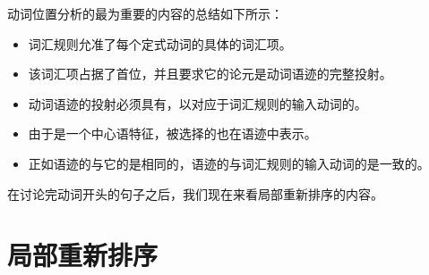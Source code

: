 动词位置分析的最为重要的内容的总结如下所示：
\begin{itemize}
\item 词汇规则允准了每个定式动词的具体的词汇项。
\item 该词汇项占据了首位，并且要求它的论元是动词语迹的完整投射。
\item 动词语迹的投射必须具有\dslv ，以对应于词汇规则的输入动词的\localv 。
\item 由于\dsl 是一个中心语特征，被选择的\dslv 也在语迹中表示。
\item 正如语迹的\dslv 与它的\localv 是相同的，语迹的\localv 与词汇规则的输入动词的\localv 是一致的。
\end{itemize}

\noindent
在讨论完动词开头的句子之后，我们现在来看局部重新排序的内容。

\section{局部重新排序}
\label{sec-HPSG-lokale-Umstellung}
\label{Abschnitt-HPSG-lokale-Umstellung}

